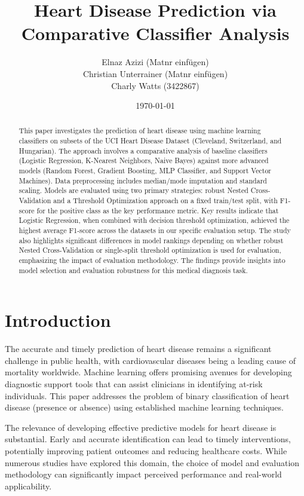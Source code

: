 \documentclass{article}
\title{Heart Disease Prediction via Comparative Classifier Analysis}
\author{
    Elnaz Azizi (Matnr einfügen) \\
    Christian Unterrainer (Matnr einfügen)\\
    Charly Watts (3422867)
}
\date{\today}
\begin{document}
\maketitle
\begin{abstract}
This paper investigates the prediction of heart disease using machine learning classifiers on subsets of the UCI Heart Disease Dataset (Cleveland, Switzerland, and Hungarian). The approach involves a comparative analysis of baseline classifiers (Logistic Regression, K-Nearest Neighbors, Naive Bayes) against more advanced models (Random Forest, Gradient Boosting, MLP Classifier, and Support Vector Machines). Data preprocessing includes median/mode imputation and standard scaling. Models are evaluated using two primary strategies: robust Nested Cross-Validation and a Threshold Optimization approach on a fixed train/test split, with F1-score for the positive class as the key performance metric. Key results indicate that Logistic Regression, when combined with decision threshold optimization, achieved the highest average F1-score across the datasets in our specific evaluation setup. The study also highlights significant differences in model rankings depending on whether robust Nested Cross-Validation or single-split threshold optimization is used for evaluation, emphasizing the impact of evaluation methodology. The findings provide insights into model selection and evaluation robustness for this medical diagnosis task.
\end{abstract}

\section{Introduction}
The accurate and timely prediction of heart disease remains a significant challenge in public health, with cardiovascular diseases being a leading cause of mortality worldwide. Machine learning offers promising avenues for developing diagnostic support tools that can assist clinicians in identifying at-risk individuals. This paper addresses the problem of binary classification of heart disease (presence or absence) using established machine learning techniques.

The relevance of developing effective predictive models for heart disease is substantial. Early and accurate identification can lead to timely interventions, potentially improving patient outcomes and reducing healthcare costs. While numerous studies have explored this domain, the choice of model and evaluation methodology can significantly impact perceived performance and real-world applicability.
\end{document}
